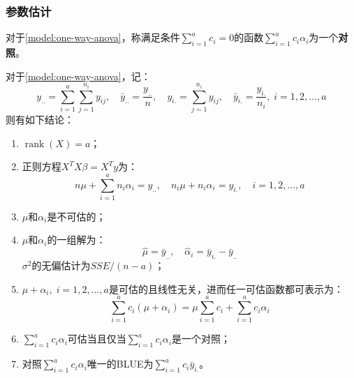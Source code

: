 \subsubsection{参数估计}
\begin{definition}
	对于\cref{model:one-way-anova}，称满足条件$\sum\limits_{i=1}^{a}c_i=0$的函数$\sum\limits_{i=1}^{a}c_i\alpha_i$为一个\textbf{对照}。
\end{definition}
\begin{theorem}\label{theo:one-way-anova-estimate}
	对于\cref{model:one-way-anova}，记：
	\begin{equation*}
		y_{..}=\sum_{i=1}^a\sum_{j=1}^{n_i}y_{ij},\quad\bar{y}_{..}=\frac{y_{..}}{n},\quad y_{i.}=\sum_{j=1}^{n_i}y_{ij},\quad \bar{y}_{i.}=\frac{y_{i.}}{n_i},\;i=1,2,\dots,a
	\end{equation*}
	则有如下结论：
	\begin{enumerate}
		\item $\operatorname{rank}(X)=a$；
		\item 正则方程$X^TX\beta=X^Ty$为：
		\begin{equation*}
			n\mu+\sum_{i=1}^{a}n_i\alpha_i=y_{..},\quad n_i\mu+n_i\alpha_i=y_{i.},\quad i=1,2,\dots,a
		\end{equation*}
		\item $\mu$和$\alpha_i$是不可估的；
		\item $\mu$和$\alpha_i$的一组解为：
		\begin{equation*}
			\hat{\mu}=\bar{y}_{..},\quad\hat{\alpha}_i=\bar{y}_{i.}-\bar{y}_{..}
		\end{equation*}
		$\sigma^2$的无偏估计为$SSE/(n-a)$；
		\item $\mu+\alpha_i,\;i=1,2,\dots,a$是可估的且线性无关，进而任一可估函数都可表示为：
		\begin{equation*}
			\sum_{i=1}^{a}c_i(\mu+\alpha_i)=\mu\sum_{i=1}^{a}c_i+\sum_{i=1}^{a}c_i\alpha_i
		\end{equation*}
		\item $\sum\limits_{i=1}^{a}c_i\alpha_i$可估当且仅当$\sum\limits_{i=1}^{a}c_i\alpha_i$是一个对照；
		\item 对照$\sum\limits_{i=1}^{a}c_i\alpha_i$唯一的BLUE为$\sum\limits_{i=1}^{a}c_i\bar{y}_{i.}$。
	\end{enumerate}
\end{theorem}
